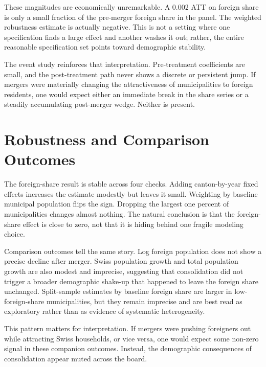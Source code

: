 \documentclass[12pt]{article}
\begin{document}
These magnitudes are economically unremarkable. A 0.002 ATT on foreign share is only a small fraction of the pre-merger foreign share in the panel. The weighted robustness estimate is actually negative. This is not a setting where one specification finds a large effect and another washes it out; rather, the entire reasonable specification set points toward demographic stability.



The event study reinforces that interpretation. Pre-treatment coefficients are small, and the post-treatment path never shows a discrete or persistent jump. If mergers were materially changing the attractiveness of municipalities to foreign residents, one would expect either an immediate break in the share series or a steadily accumulating post-merger wedge. Neither is present.

\section{Robustness and Comparison Outcomes}



The foreign-share result is stable across four checks. Adding canton-by-year fixed effects increases the estimate modestly but leaves it small. Weighting by baseline municipal population flips the sign. Dropping the largest one percent of municipalities changes almost nothing. The natural conclusion is that the foreign-share effect is close to zero, not that it is hiding behind one fragile modeling choice.



Comparison outcomes tell the same story. Log foreign population does not show a precise decline after merger. Swiss population growth and total population growth are also modest and imprecise, suggesting that consolidation did not trigger a broader demographic shake-up that happened to leave the foreign share unchanged. Split-sample estimates by baseline foreign share are larger in low-foreign-share municipalities, but they remain imprecise and are best read as exploratory rather than as evidence of systematic heterogeneity.

This pattern matters for interpretation. If mergers were pushing foreigners out while attracting Swiss households, or vice versa, one would expect some non-zero signal in these companion outcomes. Instead, the demographic consequences of consolidation appear muted across the board.
\end{document}
